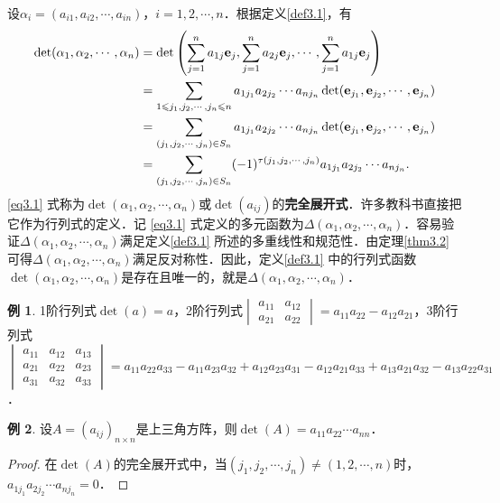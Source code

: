 \documentclass[a4paper,fontset=windows]{ctexbook}
\theoremstyle{definition}
\newtheorem{example}{例}[chapter]
\renewcommand{\le}{\leqslant}
\begin{document}
设$\alpha_i=(a_{i1},a_{i2},\cdots,a_{in})$，$i=1,2,\cdots,n$．根据定义\ref{def3.1}，有
\begin{align}
\det(\alpha_1,\alpha_2,\cdots,\alpha_n)&=\det\left(\sum_{j=1}^na_{1j}{\bf e}_j,\sum_{j=1}^na_{2j}{\bf e}_j,\cdots,\sum_{j=1}^na_{1j}{\bf e}_j\right) \notag \\
&=\sum_{1\le j_1,j_2,\cdots,j_n\le n}a_{1j_1}a_{2j_2}\cdots a_{nj_n}\det({\bf e}_{j_1},{\bf e}_{j_2},\cdots,{\bf e}_{j_n}) \notag \\
&=\sum_{(j_1,j_2,\cdots,j_n)\in S_n}a_{1j_1}a_{2j_2}\cdots a_{nj_n}\det({\bf e}_{j_1},{\bf e}_{j_2},\cdots,{\bf e}_{j_n}) \notag \\
&=\sum_{(j_1,j_2,\cdots,j_n)\in S_n}(-1)^{\tau(j_1,j_2,\cdots,j_n)}a_{1j_1}a_{2j_2}\cdots a_{nj_n}. \label{eq3.1}
\end{align}
\eqref{eq3.1} 式称为$\det(\alpha_1,\alpha_2,\cdots,\alpha_n)$或$\det(a_{ij})$的{\bf 完全展开式}．许多教科书直接把它作为行列式的定义．记 \eqref{eq3.1} 式定义的多元函数为$\Delta(\alpha_1,\alpha_2,\cdots,\alpha_n)$．容易验证$\Delta(\alpha_1,\alpha_2,\cdots,\alpha_n)$满足定义\ref{def3.1} 所述的多重线性和规范性．由定理\ref{thm3.2} 可得$\Delta(\alpha_1,\alpha_2,\cdots,\alpha_n)$满足反对称性．因此，定义\ref{def3.1} 中的行列式函数$\det(\alpha_1,\alpha_2,\cdots,\alpha_n)$是存在且唯一的，就是$\Delta(\alpha_1,\alpha_2,\cdots,\alpha_n)$．

\begin{example}
1阶行列式$\det(a)=a$，2阶行列式$\begin{vmatrix}a_{11}&a_{12} \\ a_{21}&a_{22}\end{vmatrix}=a_{11}a_{22}-a_{12}a_{21}$，3阶行列式 \\ $\begin{vmatrix}a_{11}&a_{12}&a_{13} \\ a_{21}&a_{22}&a_{23} \\ a_{31}&a_{32}&a_{33}\end{vmatrix}=a_{11}a_{22}a_{33}-a_{11}a_{23}a_{32}+a_{12}a_{23}a_{31}-a_{12}a_{21}a_{33}+a_{13}a_{21}a_{32}-a_{13}a_{22}a_{31}$．
\end{example}

\begin{example}
设$A=(a_{ij})_{n\times n}$是上三角方阵，则$\det(A)=a_{11}a_{22}\cdots a_{nn}$．
\end{example}

\begin{proof}
在$\det(A)$的完全展开式中，当$(j_1,j_2,\cdots,j_n)\ne(1,2,\cdots,n)$时，$a_{1j_1}a_{2j_2}\cdots a_{nj_n}=0$．
\end{proof}
\end{document}
